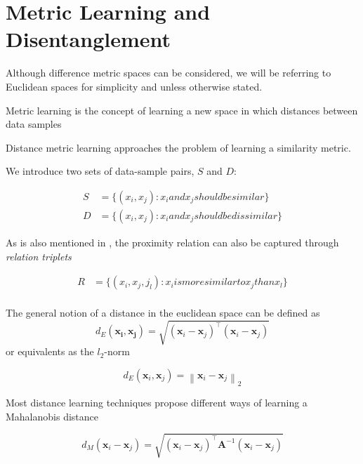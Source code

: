 \documentclass[a4paper,12pt,oneside,openright]{report}
\begin{document}
\section{Metric Learning and Disentanglement}

Although difference metric spaces can be considered, we will be referring to Euclidean spaces for simplicity and unless otherwise stated.

Metric learning is the concept of learning a new space in which distances between data samples 

Distance metric learning approaches the problem of learning a similarity metric.

We introduce two sets of data-sample pairs, $S$ and $D$:

\begin{align}
S &= \{ (x_i, x_j) : x_i and x_j should be similar\} \\
D &= \{ (x_i, x_j) : x_i and x_j should be dissimilar\}
\end{align}

As is also mentioned in \cite{moutafis17}, the proximity relation can also be captured through \textit{relation triplets}

\begin{align}
R &= \{ (x_i, x_j, j_l) : x_i is more similar to x_j than x_l \} \\
\end{align}

The general notion of a distance in the euclidean space can be defined as 
\begin{equation}
d_{E}\left(\boldsymbol{x}_{\boldsymbol{i}}, \boldsymbol{x}_{\boldsymbol{j}}\right)=\sqrt{\left(\boldsymbol{x}_{i}-\boldsymbol{x}_{j}\right)^{\top}\left(\boldsymbol{x}_{i}-\boldsymbol{x}_{j}\right)}
\end{equation}
or equivalents as the $l_2$-norm

\begin{equation}
d_{E}\left(\boldsymbol{x}_{i}, \boldsymbol{x}_{j}\right)=\left\|\boldsymbol{x}_{i}-\boldsymbol{x}_{j}\right\|_{2}
\end{equation}

Most distance learning techniques propose different ways of learning a Mahalanobis distance \cite{mahalanobis36}

\begin{equation}
d_{M}\left(\boldsymbol{x}_{i}-\boldsymbol{x}_{j}\right)=\sqrt{\left(\boldsymbol{x}_{i}-\boldsymbol{x}_{j}\right)^{\top} \boldsymbol{A}^{-1}\left(\boldsymbol{x}_{i}-\boldsymbol{x}_{j}\right)}
\end{equation}
\end{document}
